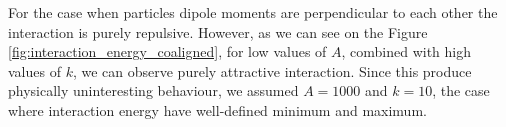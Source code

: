 For the case when particles dipole moments are perpendicular to each other the interaction is purely repulsive. However, as we can see on the Figure \ref{fig:interaction_energy_coaligned}, for low values of $A$, combined with high values of $k$, we can observe purely attractive interaction. Since this produce physically uninteresting behaviour, we assumed $A = 1000$ and $k = 10$, the case where interaction energy have well-defined minimum and maximum.

